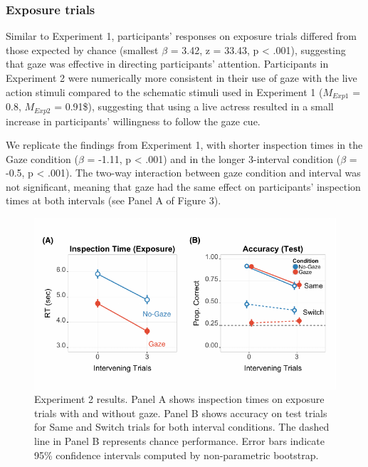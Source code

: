 \documentclass[authoryear, review]{elsarticle}
\newenvironment{CodeChunk}{}{}
\begin{document}
\subsubsection{Exposure trials}\label{exposure-trials-1}

Similar to Experiment 1, participants' responses on exposure trials
differed from those expected by chance (smallest \(\beta\) = 3.42, z =
33.43, p \textless{} .001), suggesting that gaze was effective in
directing participants' attention. Participants in Experiment 2 were
numerically more consistent in their use of gaze with the live action
stimuli compared to the schematic stimuli used in Experiment 1
(\(M_{Exp1}\) = 0.8, \(M_{Exp2}\) = 0.91\$), suggesting that using a
live actress resulted in a small increase in participants' willingness
to follow the gaze cue.

We replicate the findings from Experiment 1, with shorter inspection
times in the Gaze condition (\(\beta\) = -1.11, p \textless{} .001) and
in the longer 3-interval condition (\(\beta\) = -0.5, p \textless{}
.001). The two-way interaction between gaze condition and interval was
not significant, meaning that gaze had the same effect on participants'
inspection times at both intervals (see Panel A of Figure 3).

\begin{CodeChunk}
\begin{figure}[tb]
\includegraphics{figs/expt2-plot-1} \caption[Experiment 2 results]{Experiment 2 results. Panel A shows inspection times on exposure trials with and without gaze. Panel B shows accuracy on test trials for Same and Switch trials for both interval conditions. The dashed line in Panel B represents chance performance. Error bars indicate 95\% confidence intervals computed by non-parametric bootstrap.}\label{fig:expt2-plot}
\end{figure}
\end{CodeChunk}
\end{document}
